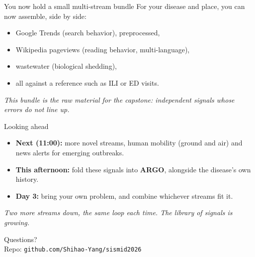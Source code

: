 \documentclass[aspectratio=169,11pt]{beamer}
\begin{document}
\begin{frame}{You now hold a small multi-stream bundle}
  For your disease and place, you can now assemble, side by side:
  \begin{itemize}
    \item Google Trends (search behavior), preprocessed,
    \item Wikipedia pageviews (reading behavior, multi-language),
    \item wastewater (biological shedding),
    \item all against a reference such as ILI or ED visits.
  \end{itemize}
  \vspace{0.3em}
  \begin{center}
    \itshape This bundle is the raw material for the capstone: independent signals whose
    errors do not line up.
  \end{center}
\end{frame}

\begin{frame}{Looking ahead}
  \begin{itemize}
    \item \textbf{Next (11:00):} more novel streams, human mobility (ground and air) and
          news alerts for emerging outbreaks.
    \item \textbf{This afternoon:} fold these signals into \textbf{ARGO}, alongside the
          disease's own history.
    \item \textbf{Day 3:} bring your own problem, and combine whichever streams fit it.
  \end{itemize}
  \vfill
  \begin{center}
    \itshape Two more streams down, the same loop each time. The library of signals is
    growing.
  \end{center}
\end{frame}

\begin{frame}[standout]
  Questions?\\[0.4em]
  \small Repo: \texttt{github.com/Shihao-Yang/sismid2026}
\end{frame}
\end{document}

